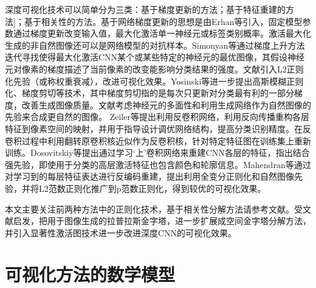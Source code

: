 深度可视化技术可以简单分为三类：基于梯度更新的方法\citep{Erhan2009,simonyan14deep,Lenc2015,Szegedy2013a,JasonYosinski2015,Nguyen2016a,Nguyen2016b}；基于特征重建的方法\citep{Zeiler2014,Brox,Mahendran2015d,Mahendran2015}]；基于相关性的方法\citep{Cao2015,Bach2016}。基于网络梯度更新的思想是由Erhan等\citep{Erhan2009}引入，固定模型参数通过梯度更新改变输入值，最大化激活单一神经元或标签类别概率。激活最大化生成的非自然图像还可以是网络模型的对抗样本\citep{Goodfellow2014}。Simonyan等\citep{simonyan14deep,Lenc2015,Szegedy2013a}通过梯度上升方法迭代寻找使得最大化激活CNN某个或某些特定的神经元的最优图像，其假设神经元对像素的梯度描述了当前像素的改变能影响分类结果的强度。文献引入L2正则化先验（或称权重衰减），改进可视化效果。Yosinski等\citep{JasonYosinski2015}进一步提出高斯模糊正则化、梯度剪切等技术，其中梯度剪切指的是每次只更新对分类最有利的一部分梯度，改善生成图像质量。文献考虑神经元的多面性和利用生成网络作为自然图像的先验来合成更自然的图像。
Zeiler等\citep{Zeiler2014}提出利用反卷积网络，利用反向传播重构各层特征到像素空间的映射，并用于指导设计调优网络结构，提高分类识别精度。在反卷积过程中利用翻转原卷积核近似作为反卷积核，针对特定特征图在训练集上重新训练。Dosovitskiy等\citep{Brox}提出通过学习‘上’卷积网络来重建CNN各层的特征，指出结合强先验，即使用于分类的高层激活特征也包含颜色和轮廓信息。Mahendran等\citep{Mahendran2015d,Mahendran2015}通过对学习到的每层特征表达进行反编码重建，提出利用全变分正则化和自然图像先验，并将L2范数正则化推广到p范数正则化，得到较优的可视化效果。


本文主要关注前两种方法中的正则化技术，基于相关性分解方法请参考文献。受文献\citep{Huang2017c,Denton2015}启发，把用于图像生成的拉普拉斯金字塔，进一步扩展成空间金字塔分解方法，并引入显著性激活图技术进一步改进深度CNN的可视化效果。
\section{可视化方法的数学模型}


